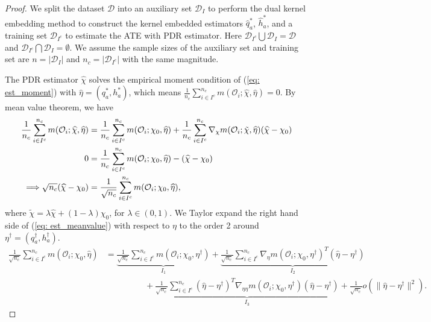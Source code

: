 \begin{proof}
    We split the dataset $\mathcal{D}$ into an auxiliary set $\mathcal{D}_I$ to perform the dual kernel embedding method to construct the 
    kernel embedded estimators $\widehat{q}_a^*$, $\widehat{h}_a^*$, and a training set $\mathcal{D}_{I^c}$ to estimate the ATE with PDR estimator.
    Here $\mathcal{D}_{I^c}\bigcup\mathcal{D}_I=\mathcal{D}$ and $\mathcal{D}_{I^c}\bigcap\mathcal{D}_I=\emptyset$. 
    We assume the sample sizes of the auxiliary set and training set are $n=|\mathcal{D}_I|$ and $n_c=|\mathcal{D}_{I^c}|$ with the same magnitude.
    
    The PDR estimator $\widehat{\chi}$ solves the empirical moment condition of (\ref{eq: est_moment}) with $\widehat{\eta}=(q_a^*,h_a^*)$, 
    which means $\frac{1}{n_c}\sum_{i\in I^c}^{n_c}m(\mathcal{O}_i;\widehat{\chi},\widehat{\eta})=0$. 
    By mean value theorem, we have 
    \begin{align}
        \label{eq: est_meanvalue}
        \frac{1}{n_c}\sum_{i\in I^c}^{n_c}m(\mathcal{O}_i;\widehat{\chi},\widehat{\eta}) &= \frac{1}{n_c}\sum_{i\in I^c}^{n_c}m(\mathcal{O}_i;\chi_0,\widehat{\eta}) + \frac{1}{n_c}\sum_{i\in I^c}^{n_c}\nabla_{\chi}m(\mathcal{O}_i;\tilde{\chi},\widehat{\eta})(\widehat{\chi}-\chi_0) \notag\\
                                                                                       0 &= \frac{1}{n_c}\sum_{i\in I^c}^{n_c}m(\mathcal{O}_i;\chi_0,\widehat{\eta}) - (\widehat{\chi}-\chi_0) \notag\\
                                          \Longrightarrow\sqrt{n_c}(\widehat{\chi}-\chi_0) &= \frac{1}{\sqrt{n_c}}\sum_{i\in I^c}^{n_c}m(\mathcal{O}_i;\chi_0,\widehat{\eta}), 
    \end{align}
    where $\tilde{\chi}=\lambda\widehat{\chi}+(1-\lambda)\chi_0$, for $\lambda\in(0,1)$.
    We Taylor expand the right hand side of (\ref{eq: est_meanvalue}) with respect to $\eta$ to the order 2 around $\eta^{\dagger}=(q_a^{\dagger},h_a^{\dagger})$. 
    \begin{align*}
        \frac{1}{\sqrt{n_c}}\sum_{i\in I^c}^{n_c}m(\mathcal{O}_i;\chi_0,\widehat{\eta}) &= \underbrace{\frac{1}{\sqrt{n_c}}\sum_{i\in I^c}^{n_c}m(\mathcal{O}_i;\chi_0,\eta^{\dagger})}_{I_1} + \underbrace{\frac{1}{\sqrt{n_c}}\sum_{i\in I^c}^{n_c}\nabla_{\eta}m(\mathcal{O}_i;\chi_0,\eta^{\dagger})^T(\widehat{\eta}-\eta^{\dagger})}_{I_2} \\
                                                                                        & \phantom{\frac{1}{\sqrt{n_c}}\sum_{i\in I^c}^{n_c}} +\underbrace{\frac{1}{\sqrt{n_c}}\sum_{i\in I^c}^{n_c}(\widehat{\eta}-\eta^{\dagger})^T\nabla_{\eta\eta}m(\mathcal{O}_i;\chi_0,\eta^{\dagger})(\widehat{\eta}-\eta^{\dagger})}_{I_3} + \frac{1}{\sqrt{n_c}}o(\|\widehat{\eta}-\eta^{\dagger}\|^2).

\end{align*}
\end{proof}
